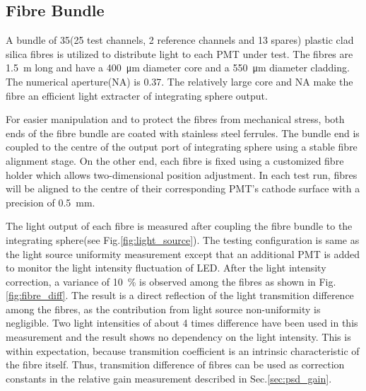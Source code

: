 \documentclass[5p, times]{elsarticle}
\begin{document}

\subsection{Fibre Bundle}
\label{sec:fibre_bundle}

A bundle of 35(25 test channels, 2 reference channels and 13 spares) plastic clad silica fibres is utilized to distribute light to each PMT under test.
The fibres are \SI{1.5}{\meter} long and have a \SI{400}{\micro\meter} diameter core and a \SI{550}{\micro\meter} diameter cladding.
The numerical aperture(NA) is 0.37.
The relatively large core and NA make the fibre an efficient light extracter of integrating sphere output. 

For easier manipulation and to protect the fibres from mechanical stress, both ends of the fibre bundle are coated with stainless steel ferrules.
The bundle end is coupled to the centre of the output port of integrating sphere using a stable fibre alignment stage.
On the other end, each fibre is fixed using a customized fibre holder which allows two-dimensional position adjustment.
In each test run, fibres will be aligned to the centre of their corresponding PMT's cathode surface with a precision of \SI{0.5}{\milli\meter}.  

The light output of each fibre is measured after coupling the fibre bundle to the integrating sphere(see Fig.\ref{fig:light_source}).
The testing configuration is same as the light source uniformity measurement except that an additional PMT is added to monitor the light intensity fluctuation of LED.
After the light intensity correction, a variance of \SI{10}{\percent} is observed among the fibres as shown in Fig.\ref{fig:fibre_diff}.
The result is a direct reflection of the light transmition difference among the fibres, as the contribution from light source non-uniformity is negligible.
Two light intensities of about 4 times difference have been used in this measurement and the result shows no dependency on the light intensity. 
This is within expectation, because transmition coefficient is an intrinsic characteristic of the fibre itself.
Thus, transmition difference of fibres can be used as correction constants in the relative gain measurement described in Sec.\ref{sec:psd_gain}.
\end{document}
